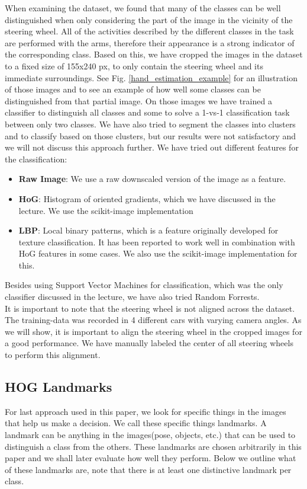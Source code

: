 \documentclass[10pt,twocolumn,letterpaper]{article}
\begin{document}
When examining the dataset, we found that many of the classes can be well distinguished when only considering the part of the image in the vicinity of the steering wheel. All of the activities described by the different classes in the task are performed with the arms, therefore their appearance is a strong indicator of the corresponding class. Based on this, we have cropped the images in the dataset to a fixed size of 155x240 px, to only contain the steering wheel and its immediate surroundings. See Fig. \ref{hand_estimation_example} for an illustration of those images and to see an example of how well some classes can be distinguished from that partial image. On those images we have trained a classifier to distinguish all classes and some to solve a 1-vs-1 classification task between only two classes. We have also tried to segment the classes into clusters and to classify based on those clusters, but our results were not satisfactory and we will not discuss this approach further. We have tried out different features for the classification:
\begin{itemize}
	\item \textbf{Raw Image}: We use a raw downscaled version of the image as a feature.
	\item \textbf{HoG}: Histogram of oriented gradients, which we have discussed in the lecture. We use the scikit-image implementation
	\item \textbf{LBP}: Local binary patterns, which is a feature originally developed for texture classification. It has been reported to work well in combination with HoG features in some cases. We also use the scikit-image implementation for this.
\end{itemize}
Besides using Support Vector Machines for classification, which was the only classifier discussed in the lecture, we have also tried Random Forrests.\\
It is important to note that the steering wheel is not aligned across the dataset. The training-data was recorded in 4 different cars with varying camera angles. As we will show, it is important to align the steering wheel in the cropped images for a good performance. We have manually labeled the center of all steering wheels to perform this alignment.



\subsection{HOG Landmarks}
For last approach used in this paper, we look for specific things in the images that help us make a decision. We call these specific things landmarks. A landmark can be anything in the images(pose, objects, etc.) that can be used to distinguish a class from the others. These landmarks are chosen arbitrarily in this paper and we shall later evaluate how well they perform. Below we outline what of these landmarks are, note that there is at least one distinctive landmark per class.
\end{document}
